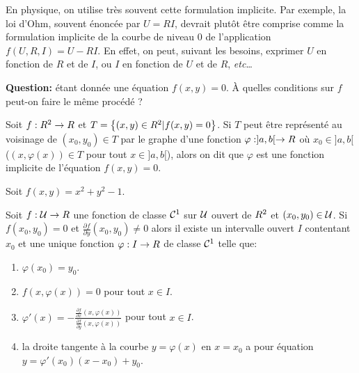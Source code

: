 \begin{remark}
    En physique, on utilise très souvent cette formulation implicite. Par exemple, la loi d'Ohm, souvent énoncée par $U=RI$, devrait plutôt être comprise comme la formulation implicite de la courbe de niveau $0$ de l'application  $f(U, R, I) = U - RI$. En effet, on peut, suivant les besoins, exprimer $U$ en fonction de $R$ et de $I$, ou $I$ en fonction de $U$ et de $R$, \textit{etc}\ldots 
\end{remark}

\medskip

{\bf\sffamily Question:} étant donnée une équation $f(x,y) =0$. À quelles conditions sur $f$ peut-on faire le même procédé ?

\sld{\vfill\pagebreak[5]}%
\begin{definition}
Soit $f:R^2 \to R$ et $T=\left\{ (x,y) \in R^2 | f(x,y) = 0 \right\}$. Si $T$ peut être représenté au voisinage de $ (x_0,y_0) \in T$ par le graphe d'une fonction $\varphi:]a,b[\to R $ où $x_0 \in ]a,b[$ (\ie $(x,\varphi(x)) \in T $ pour tout $x\in]a,b[$), alors on dit que $\varphi$ est une fonction implicite de l'équation $f(x,y) =0$.
\end{definition}

\begin{exemple}
        Soit $f(x,y) = x^2 + y^2 -1$. 
        \pl{\rep{7cm}}
\end{exemple}

\sld{\vfill\pagebreak[5]}%
\begin{theorem}
        Soit $f:\mathcal{U} \to R$ une fonction de classe $\mathcal{C}^1$ sur $\mathcal{U}$ ouvert de $R^2$ et $(x_0,y_0) \in \mathcal{U} $. Si $f(x_0,y_0) = 0$ et $\frac{\partial f}{\partial y} (x_0,y_0)  \neq 0$ alors il existe un intervalle ouvert $I$ contentant $x_0$ et une unique fonction $\varphi:I \to R$ de classe $\mathcal{C}^1$ telle que:
        \begin{enumerate}
                \item $\varphi(x_0) = y_0$.
                \item $f(x,\varphi(x)) = 0$ pour tout $x\in I$.
                \item $\varphi'(x) = -\frac{\frac{\partial f}{\partial x} (x,\varphi(x))  }{\frac{\partial f}{\partial y} (x,\varphi(x)) }$ pour tout $x\in I$.
                \item la droite tangente à la courbe $y=\varphi(x)$ en $x=x_0$ a pour équation $y=\varphi'(x_0) (x-x_0) + y_0 $.
        \end{enumerate}
\end{theorem}

